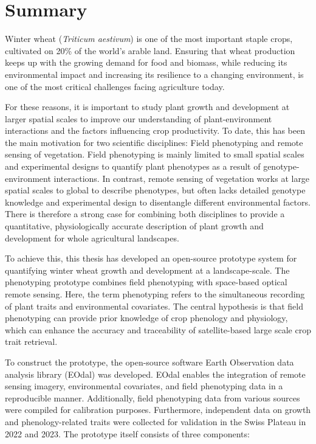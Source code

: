 \chapter*{Summary}

Winter wheat (\textsl{Triticum aestivum}) is one of the most important staple crops, cultivated on 20\% of the world's arable land. Ensuring that wheat production keeps up with the growing demand for food and biomass, while reducing its environmental impact and increasing its resilience to a changing environment, is one of the most critical challenges facing agriculture today.

For these reasons, it is important to study plant growth and development at larger spatial scales to improve our understanding of plant-environment interactions and the factors influencing crop productivity. To date, this has been the main motivation for two scientific disciplines: Field phenotyping and remote sensing of vegetation. Field phenotyping is mainly limited to small spatial scales and experimental designs to quantify plant phenotypes as a result of genotype-environment interactions. In contrast, remote sensing of vegetation works at large spatial scales to global to describe phenotypes, but often lacks detailed genotype knowledge and experimental design to disentangle different environmental factors. There is therefore a strong case for combining both disciplines to provide a quantitative, physiologically accurate description of plant growth and development for whole agricultural landscapes.

To achieve this, this thesis has developed an open-source prototype system for quantifying winter wheat growth and development at a landscape-scale. The phenotyping prototype combines field phenotyping with space-based optical remote sensing. Here, the term phenotyping refers to the simultaneous recording of plant traits and environmental covariates. The central hypothesis is that field phenotyping can provide prior knowledge of crop phenology and physiology, which can enhance the accuracy and traceability of satellite-based large scale crop trait retrieval.

To construct the prototype, the open-source software Earth Observation data analysis library (EOdal) was developed. EOdal enables the integration of remote sensing imagery, environmental covariates, and field phenotyping data in a reproducible manner. Additionally, field phenotyping data from various sources were compiled for calibration purposes. Furthermore, independent data on growth and phenology-related traits were collected for validation in the Swiss Plateau in 2022 and 2023. The prototype itself consists of three components:

